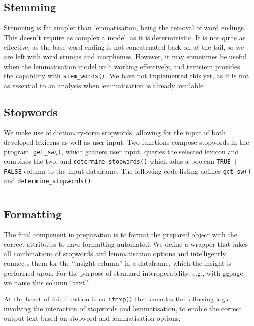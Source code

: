 \documentclass[11pt, a4paper, oneside]{report}
\begin{document}
\subsection{Stemming}

Stemming is far simpler than lemmatisation, being the removal of word
endings. This doesn't require as complex a model, as it is
deterministic. It is not quite as effective, as the base word ending
is not concatenated back on at the tail, so we are left with word
stumps and morphemes. However, it may sometimes be useful when the
lemmatisation model isn't working effectively, and textstem provides
the capability with \texttt{stem_words()}. We have not
implemented this yet, as it is not as essential to an analysis when
lemmatisation is already available.

\subsection{Stopwords}\label{sec:stopwords}

We make use of dictionary-form stopwords, allowing for the input of
both developed lexicons as well as user input. Two functions compose
stopwords in the programl \texttt{get_sw()}, which gathers user
input, queries the selected lexicon and combines the two, and
\texttt{determine_stopwords()} which adds a boolean
\texttt{TRUE | FALSE} column to the input dataframe. The
following code listing defines \texttt{get_sw()} and
\texttt{determine_stopwords()}:

\inputminted[frame=lines,fontsize=\scriptsize,xleftmargin=\parindent,linenos]{R}{R/stopwords.R}

\subsection{Formatting}\label{sec:formatting}

The final component in preparation is to format the prepared object
with the correct attributes to have formatting automated. We define a
wrapper that takes all combinations of stopwords and lemmatisation
options and intelligently connects them for the ``insight column'' in
a dataframe, which the insight is performed upon. For the purpose of
standard interoperability, e.g., with ggpage, we name this column
``text''.

At the heart of this function is an \texttt{ifexp()} that
encodes the following logic involving the interaction of stopwords and
lemmatisation, to enable the correct output text based on stopword and
lemmatisation options;
\end{document}
